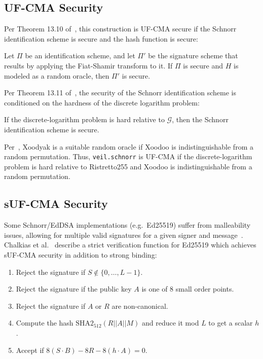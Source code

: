 \subsection{UF-CMA Security}\label{subsec:veil.schnorr-uf-cma}

Per Theorem 13.10 of~\cite[p. 478]{katz2020}, this construction is UF-CMA secure if the Schnorr identification scheme
is secure and the hash function is secure:

\begin{displayquote}
    Let $\Pi$ be an identification scheme, and let $\Pi'$ be the signature scheme that results by applying the
    Fiat-Shamir transform to it.
    If $\Pi$ is secure and $H$ is modeled as a random oracle, then $\Pi'$ is secure.
\end{displayquote}

Per Theorem 13.11 of~\cite[p. 481]{katz2020}, the security of the Schnorr identification scheme is conditioned on the
hardness of the discrete logarithm problem:

\begin{displayquote}
    If the discrete-logarithm problem is hard relative to $\mathcal{G}$, then the Schnorr identification scheme is
    secure.
\end{displayquote}

Per~\cite[Sec. 5.10]{bertoni2011sponge}, Xoodyak is a suitable random oracle if Xoodoo is indistinguishable from a
random permutation.
Thus, \texttt{veil.schnorr} is UF-CMA if the discrete-logarithm problem is hard relative to Ristretto255 and
Xoodoo is indistinguishable from a random permutation.

\subsection{sUF-CMA Security}\label{subsec:veil.schnorr-suf-cma}

Some Schnorr/EdDSA implementations (e.g.\ Ed25519) suffer from malleability issues, allowing for multiple valid
signatures for a given signer and message~\cite{brendel2021}.
Chalkias et al.~\cite{chalkias2020} describe a strict verification function for Ed25519 which achieves sUF-CMA security
in addition to strong binding:

\begin{displayquote}
    \begin{enumerate}
        \item Reject the signature if $S \not\in \{0,\ldots,L-1\}$.
        \item Reject the signature if the public key $A$ is one of 8 small order points.
        \item Reject the signature if $A$ or $R$ are non-canonical.
        \item Compute the hash $\text{SHA2}_{512}(R||A||M)$ and reduce it mod $L$ to get a scalar $h$.
        \item Accept if $8(S \cdot B)-8R-8(h \cdot A)=0$.
    \end{enumerate}
\end{displayquote}

